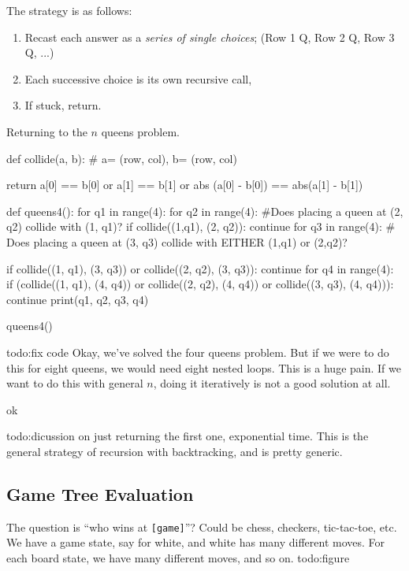 The strategy is as follows:
\begin{enumerate}[label=(\arabic*)]
\setlength\itemsep{-.2em}
    \item Recast each answer as a \emph{series of single choices}; (Row 1 Q, Row 2 Q, Row 3 Q, ...)
    \item Each successive choice is its own recursive call,
    \item If stuck, return.
\end{enumerate}
Returning to the $n$ queens problem.
\begin{python}
    def collide(a, b):
    # a= (row, col), b= (row, col)

    return a[0] == b[0] or a[1] == b[1] or abs (a[0] - b[0]) == abs(a[1] - b[1])

def queens4():
    for q1 in range(4):
        for q2 in range(4):
            #Does placing a queen at (2, q2) collide with (1, q1)?
            if collide((1,q1), (2, q2)):
                continue
            for q3 in range(4):
                # Does placing a queen at (3, q3) collide with EITHER (1,q1) or (2,q2)?

                if collide((1, q1), (3, q3)) or collide((2, q2), (3, q3)):
                    continue
                for q4 in range(4):
                    if (collide((1, q1), (4, q4)) or collide((2, q2), (4, q4))
                        or collide((3, q3), (4, q4))):
                        continue
                    print(q1, q2, q3, q4)

queens4()
\end{python}
{\color{red}todo:fix code} 
Okay, we've solved the four queens problem. But if we were to do this for eight queens, we would need eight nested loops. This is a huge pain. If we want to do this with general $n$, doing it iteratively is not a good solution at all.

\begin{python}
    ok
\end{python}
{\color{red}todo:dicussion on just returning the first one, exponential time.} This is the general strategy of recursion with backtracking, and is pretty generic.

\subsection{Game Tree Evaluation}
The question is ``who wins at \texttt{[game]}''? Could be chess, checkers, tic-tac-toe, etc. We have a game state, say for white, and white has many different moves. For each board state, we have many different moves, and so on. {\color{red}todo:figure} 

